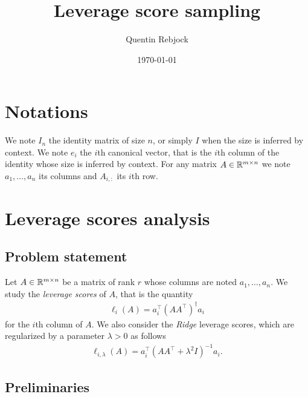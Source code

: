 \documentclass{article}
\title{Leverage score sampling}
\author{Quentin Rebjock}
\date{\today}
\begin{document}
\maketitle

\section{Notations}\label{sec:notations}

We note $I_n$ the identity matrix of size $n$, or simply $I$ when the size is
inferred by context.
We note $e_i$ the $i$th canonical vector, that is the $i$th column of the
identity whose size is inferred by context.
For any matrix $A \in {\mathbb R}^{m \times n}$ we note $a_1, \dots, a_n$ its columns
and $A_{i,:}$ its $i$th row.

\section{Leverage scores analysis}\label{sec:questions}

\subsection{Problem statement}\label{subsec:probstat}

Let $A \in {\mathbb R}^{m \times n}$ be a matrix of rank $r$ whose columns are noted
$a_1, \dots, a_n$.
We study the \textit{leverage scores} of $A$, that is the quantity
\begin{align*}
  \ell_i(A) = a_i^\top (A A^\top)^\dagger a_i
\end{align*}
for the $i$th column of $A$.
We also consider the \textit{Ridge} leverage scores, which are regularized by a
parameter $\lambda > 0$ as follows
\begin{align*}
  \ell_{i,\lambda}(A) = a_i^\top (A A^\top + \lambda^2 I)^{-1} a_i.
\end{align*}

\subsection{Preliminaries}\label{subsec:preliminaries}
\end{document}
